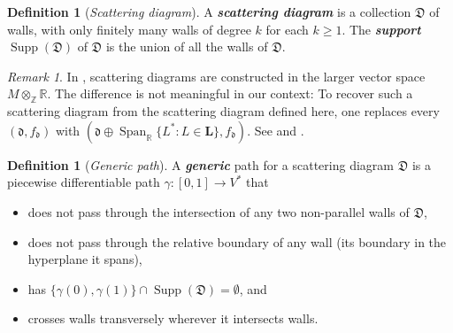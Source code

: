 \documentclass{amsart}
\theoremstyle{definition}
\newtheorem{definition}[proposition]{Definition}
\theoremstyle{remark}
\newtheorem{remark}[proposition]{Remark}
\numberwithin{equation}{section}
\newcommand{\newword}[1]{\textbf{\emph{#1}}}
\newcommand{\integers}{\mathbb Z}
\newcommand{\reals}{\mathbb R}
\newcommand{\set}[1]{{\lbrace #1 \rbrace}}
\newcommand{\D}{{\mathfrak D}}
\newcommand{\0}{{\mathbf{0}}}
\DeclareMathOperator{\Span}{Span}
\renewcommand{\L}{\mathbf{L}}
\newcommand{\Supp}{\operatorname{Supp}}
\renewcommand{\d}{{\mathfrak d}}
\begin{document}
\begin{definition}[\emph{Scattering diagram}]\label{scat def}
A \newword{scattering diagram} is a collection $\D$ of walls, with only finitely many walls of degree $k$ for each $k\ge1$.
The \newword{support} $\Supp(\D)$ of $\D$ is the union of all the walls of $\D$.
\end{definition}

\begin{remark}\label{useless dimensions}
In \cite{GHKK}, scattering diagrams are constructed in the larger vector space $M\otimes_\integers\reals$.
The difference is not meaningful in our context:  
To recover such a scattering diagram from the scattering diagram defined here, one replaces every $(\d,f_\d)$ with $(\d\oplus\Span_\reals\set{L^*:L\in\L},f_\d)$.
See \cite[Remark~2.12]{scatfan} and \cite[Remark~2.13]{scatfan}.
\end{remark}

\begin{definition}[\emph{Generic path}]\label{generic def}
A \newword{generic} path for a scattering diagram $\D$ is a piecewise differentiable path $\gamma:[0,1]\to V^*$ that
\begin{itemize}
\item does not pass through the intersection of any two non-parallel walls of $\D$,
\item does not pass through the relative boundary of any wall (its boundary in the hyperplane it spans),
\item has $\set{\gamma(0),\gamma(1)}\cap\Supp(\D)=\emptyset$, and
\item crosses walls transversely wherever it intersects walls.
\end{itemize}
\end{definition}
\end{document}

